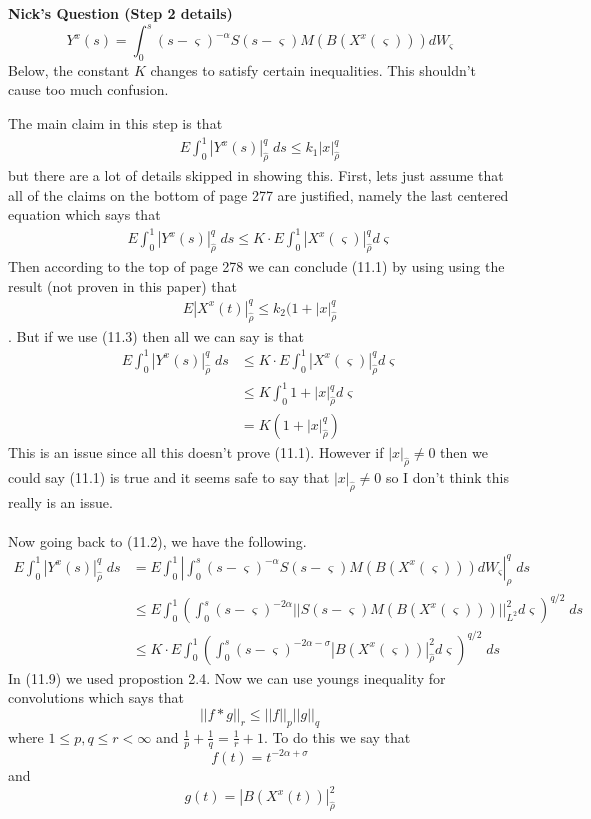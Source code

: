 \documentclass[a4paper,11pt]{article}
\theoremstyle{plain}
\theoremstyle{definition}
\newcounter{NQ}
\newenvironment{NickQuestion}[1][] %
  {\refstepcounter{NQ}
  \begin{mdframed}[backgroundcolor=lightgray]\textbf{Nick's Question \theNQ \: #1~~}~~~\noindent}%
  {\end{mdframed}}
\numberwithin{NQ}{section}
\numberwithin{LQ}{section}
\numberwithin{ZQ}{section}
\begin{document}
\begin{NickQuestion}[(Step 2 details)]
$$ Y^x(s)=\int_0^s(s-\varsigma)^{-\alpha}S(s-\varsigma)M(B(X^x(\varsigma)))dW_\varsigma  $$
Below, the constant $K$ changes to satisfy certain inequalities. This shouldn't cause too much confusion. 

The main claim in this step is that \begin{align} E\int_0^1|Y^x(s)|_{\hat\rho}^q \; ds \le k_1|x|_{\hat\rho}^q \end{align}
but there are a lot of details skipped in showing this. First, lets just assume that all of the claims on the bottom of page 277 are justified, namely the last centered equation which says that 
\begin{align} E\int_0^1|Y^x(s)|_{\hat\rho}^q \; ds \le K\cdot E\int_0^1|X^x(\varsigma)|_{\hat\rho}^q  d\varsigma \end{align} 
Then according to the top of page 278 we can conclude (11.1) by using using the result (not proven in this paper) that \begin{align} E|X^x(t)|_{\hat\rho}^q \le k_2(1+|x|_{\hat\rho}^q \end{align}. 
But if we use (11.3) then all we can say is that 
\begin{align}
    E\int_0^1|Y^x(s)|_{\hat\rho}^q \; ds &\le K\cdot E\int_0^1|X^x(\varsigma)|_{\hat\rho}^q  d\varsigma
    \\&\le K \int_0^1 1+|x|_{\hat\rho}^q d\varsigma 
    \\&=K ( 1+|x|_{\hat\rho}^q )
\end{align}
This is an issue since all this doesn't prove (11.1). However if $|x|_{\hat\rho}\not=0$ then we could say (11.1) is true and it seems safe to  say that $|x|_{\hat\rho}\not=0$ so I don't think this really is an issue. 
\\ \\
Now going back to (11.2), we have the following. 
\begin{align}
   E\int_0^1|Y^x(s)|_{\hat\rho}^q \; ds &= E\int_0^1|\int_0^s(s-\varsigma)^{-\alpha}S(s-\varsigma)M(B(X^x(\varsigma)))dW_\varsigma|_{\hat\rho}^q \; ds 
   \\ &\le E\int_0^1\left(\int_0^s(s-\varsigma)^{-2\alpha}||S(s-\varsigma)M(B(X^x(\varsigma)))||^2_{L^2}d\varsigma\right)^{q/2} \; ds
   \\ &\le K \cdot E\int_0^1\left(\int_0^s(s-\varsigma)^{-2\alpha-\sigma}|B(X^x(\varsigma))|_{\hat\rho}^2d\varsigma\right)^{q/2} \; ds
\end{align}
In (11.9) we used propostion 2.4. Now we can use youngs inequality for convolutions which says that $$ ||f*g||_r\le||f||_p||g||_q$$ where $1\le p,q \le r <\infty$ and $\frac{1}{p}+\frac{1}{q}=\frac{1}{r}+1$. To do this we say that $$f(t)=t^{-2\alpha+\sigma}$$ and $$ g(t)=|B(X^x(t))|_{\hat\rho}^2$$

\end{NickQuestion}
\end{document}
